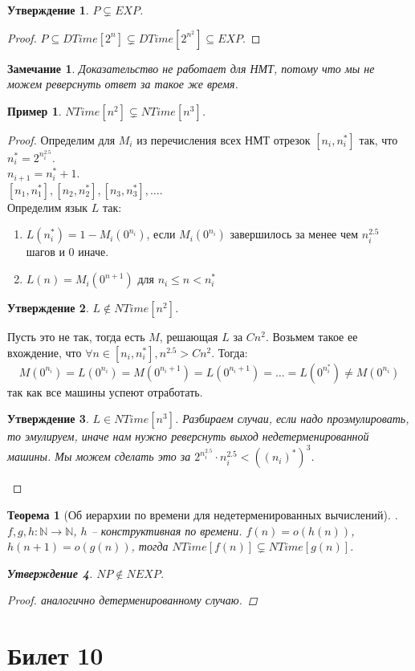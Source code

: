 \documentclass[12pt, letterpaper]{article}
\newtheorem{theorem}{Теорема}[section]
\newtheorem{prop}{Утверждение}[section]
\newtheorem{sample}{Пример}[section]
\newtheorem{note}{Замечание}[section]
\newcommand{\N}{\mathbb{N}}
\begin{document}
\begin{prop}
$P \subsetneq EXP$.
\end{prop}
\begin{proof}
$P \subseteq DTime[2^n] \subsetneq DTime[2^{n^2}] \subseteq EXP$.
\end{proof}

\begin{note}
Доказательство не работает для НМТ, потому что мы не можем реверснуть ответ за такое же время.
\end{note}

\begin{sample}
$NTime[n^2] \subsetneq NTime[n^3]$.
\end{sample}
\begin{proof}
Определим для $M_i$ из перечисления всех НМТ отрезок $[n_i, n_i^{*}]$ так, что $n_i^{*} = 2^{n_i^{2.5}}$. \\
$n_{i+1} = n_i^{*}+1$.\\
$[n_1, n_1^{*}], [n_2, n_2^{*}], [n_3, n_3^{*}], \ldots$.\\
Определим язык $L$ так:
\begin{enumerate}
\item $L(n_i^{*}) = 1 - M_i(0^{n_i})$, если $M_i(0^{n_i})$ завершилось за менее чем $n_i^{2.5}$ шагов и 0 иначе.
\item $L(n) = M_i(0^{n+1})$ для $n_i \leq n < n_i^{*}$ 
\end{enumerate}
\begin{prop}
$L \notin NTime[n^2]$.
\end{prop}
Пусть это не так, тогда есть $M$, решающая $L$ за $Cn^2$. Возьмем такое ее вхождение, что $\forall n \in [n_i, n_i^{*}], n^{2.5} > Cn^2$. Тогда:
$$M(0^{n_i}) = L(0^{n_i}) = M(0^{n_i+1}) = L(0^{n_i+1}) = \ldots = L(0^{n_i^{*}}) \neq M(0^{n_i}) $$
так как все машины успеют отработать.
\begin{prop}
$L \in NTime[n^3]$. Разбираем случаи, если надо проэмулировать, то эмулируем, иначе нам нужно реверснуть выход недетерменированной машины. Мы можем сделать это за $2^{n_i^{2.5}} \cdot n_i^{2.5} < ((n_i)^{*})^3$.
\end{prop}
\end{proof}

\begin{theorem}[Об иерархии по времени для недетерменированных вычислений].
$f,g,h : \N \rightarrow \N$, $h$ -- конструктивная по времени.
$f(n) = o(h(n))$, $h(n+1) = o(g(n))$, тогда $NTime[f(n)] \subsetneq NTime[g(n)]$.

\begin{prop}
$NP \notin NEXP$.
\end{prop}
\begin{proof} аналогично детерменированному случаю.\end{proof}

\end{theorem}

\section{Билет 10}
\end{document}
